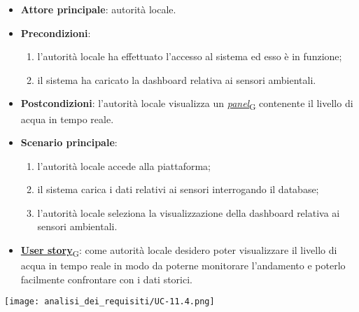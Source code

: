 \begin{itemize}
	\item \textbf{Attore principale}: autorità locale.
	\item \textbf{Precondizioni}:
	      \begin{enumerate}
		      \item l'autorità locale ha effettuato l'accesso al sistema ed esso è in funzione;
		      \item il sistema ha caricato la dashboard relativa ai sensori ambientali.
	      \end{enumerate}
	\item \textbf{Postcondizioni}: l'autorità locale visualizza un \href{https://7last.github.io/docs/pb/documentazione-interna/glossario\#panel}{\textit{panel}\textsubscript{G}} contenente il livello di acqua in tempo reale.
	\item \textbf{Scenario principale}:
	      \begin{enumerate}
		      \item l'autorità locale accede alla piattaforma;
		      \item il sistema carica i dati relativi ai sensori interrogando il database;
		      \item l'autorità locale seleziona la visualizzazione della dashboard relativa ai sensori ambientali.
	      \end{enumerate}
	\item \href{https://7last.github.io/docs/pb/documentazione-interna/glossario\#user-story}{\textbf{User story}\textsubscript{G}}:
	      come autorità locale desidero poter visualizzare il livello di acqua in tempo reale in modo da poterne monitorare l'andamento
	      e poterlo facilmente confrontare con i dati storici.
\end{itemize}
\begin{center}
	\texttt{[image: analisi\_dei\_requisiti/UC-11.4.png]}
\end{center}



